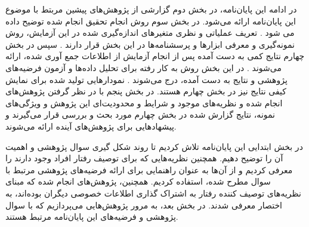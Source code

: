 در ادامه این پایان‌نامه، در بخش دوم گزارشی از پژوهش‌های پیشین مربتط با موضوع این پایان‌نامه ارائه می‌شود.
در بخش سوم روش انجام تحقیق انجام شده توضیح داده می شود
\!.
تعریف عملیاتی و نظری متغیر‌های اندازه‌گیری شده در این آزمایش، روش نمونه‌گیری و معرفی ابزارها و پرسشنامه‌ها در این بخش قرار دارند
\!.
سپس در بخش چهارم نتایج کمی به دست آمده پس از انجام آزمایش از اطلاعات جمع آوری شده، ارائه می‌شوند
\!.
در این بخش  روش به کار رفته برای تحلیل داده‌ها و آزمون فرضیه‌های پژوهشی و نتایج  به دست آمده، درج  می‌شوند
\!.
نمودار‌هایی تولید شده برای نمایش کیفی نتایج نیز در بخش چهارم هستند.
در بخش پنجم با در نظر گرفتن پژوهش‌های انجام شده و نظریه‌های موجود و شرایط و محدودیت‌ای این پژوهش و ویژگی‌های نمونه، نتایج گزارش شده در بخش چهارم مورد بحث و بررسی
قرار می‌گیرند و پیشهادهایی برای پژوهش‌های آینده ارائه می‌شوند.

در بخش ابتدایی این پایان‌نامه تلاش کردیم تا روند شکل گیری سوال پژوهشی و اهمیت آن را توضیح دهیم.
همچنین نظریه‌هایی که برای توصیف رفتار افراد وجود دارند را معرفی کردیم و از آن‌ها به عنوان راهنمایی
برای ارائه فرضیه‌های پژوهشی مرتبط با سوال‌ مطرح شده، استفاده کردیم.
همچنین، پژوهش‌های انجام شده که مبنای نظریه‌های توصیف کننده رفتار به اشتراک گذاری اطلاعات خصوصی دیگران
بوده‌اند، به اختصار معرفی شدند. در بخش بعد، به مرور پژوهش‌هایی می‌پردازیم که با سوال پژوهشی و فرضیه‌های این پایان‌نامه مرتبط هستند.



